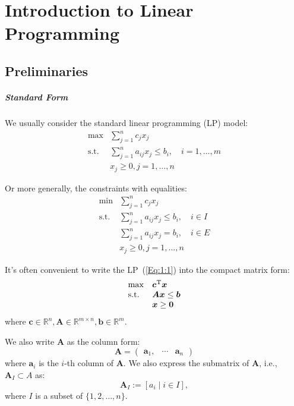 \chapter{Introduction to Linear Programming}

\section{Preliminaries}
\paragraph{Standard Form}
We usually consider the standard linear programming (LP) model:
\begin{equation}\label{Eq:1:1}
\begin{array}{ll}
\max&\sum_{j=1}^nc_jx_j\\
\text{s.t.}&\sum_{j=1}^na_{ij}x_j\le b_i,\quad i=1,\dots,m\\
&x_j\ge 0, j=1,\dots,n
\end{array}
\end{equation}

Or more generally, the constraints with equalities:
\begin{equation*}
\begin{array}{ll}
\min&\sum_{j=1}^nc_jx_j\\
\text{s.t.}&\sum_{j=1}^na_{ij}x_j\le b_i,\quad i\in I\\
&\sum_{j=1}^na_{ij}x_j= b_i,\quad i\in E\\
&x_j\ge 0, j=1,\dots,n
\end{array}
\end{equation*}

It's often convenient to write the LP~(\ref{Eq:1:1}) into the compact matrix form:
\begin{equation}\label{Eq:1:2}
\begin{array}{ll}
\max&\bm c^{\mathrm T}\bm x\\
\text{s.t.}&\bm{Ax}\le\bm b\\
&\bm x\ge\bm0
\end{array}
\end{equation}
where $\bm c\in\mathbb{R}^n,\bm A\in\mathbb{R}^{m\times n},\bm b\in\mathbb{R}^m$.

We also write $\bm A$ as the column form:
\[
\bm A=\begin{pmatrix}
\bm a_1,&\cdots&\bm a_n
\end{pmatrix}
\]
where $\bm a_i$ is the $i$-th column of $\bm A$. We also express the submatrix of $\bm A$, i.e., $\bm A_I\subset A$ as:
\[
\bm A_I:=[a_i\mid i\in I],
\]
where $I$ is a subset of $\{1,2,\dots,n\}$.

